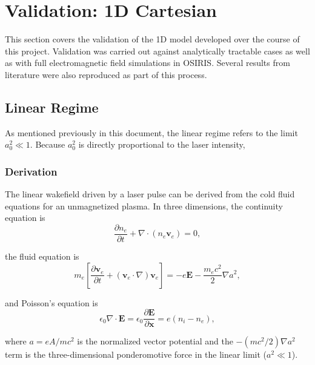 \newpage
\section{Validation: 1D Cartesian}

This section covers the validation of the 1D model developed over the course of
this project. Validation was carried out against analytically tractable cases as
well as with full electromagnetic field simulations in OSIRIS. Several results
from literature were also reproduced as part of this process.

\subsection{Linear Regime}

    As mentioned previously in this document, the linear regime refers to the 
    limit $a_0^2 \ll 1$. Because $a_0^2$ is directly proportional to
    the laser intensity, 

    \subsubsection{Derivation}

    The linear wakefield driven by a laser pulse can be derived from the cold
    fluid equations for an unmagnetized plasma. In three dimensions, the 
    continuity equation is
    \begin{equation*}
        \frac{\partial n_e}{\partial t} + \nabla \cdot (n_e\mathbf{v}_e) = 0,
    \end{equation*}

    the fluid equation is
    \begin{equation*}
        m_e\left[\frac{\partial \mathbf{v}_e}{\partial t} + (\mathbf{v}_e \cdot
        \nabla)\mathbf{v}_e\right] = -e\mathbf{E} - \frac{m_ec^2}{2}\nabla a^2,
    \end{equation*}

    and Poisson's equation is
    \begin{equation*}
        \epsilon_0 \nabla \cdot \mathbf{E} = \epsilon_0\frac{\partial 
        \mathbf{E}}{\partial \mathbf{x}} = e(n_i - n_e),
    \end{equation*}


    where $a = eA/mc^2$ is the normalized vector potential and the 
    $-(mc^2/2)\nabla a^2$ term is the three-dimensional ponderomotive force in 
    the linear limit ($a^2 \ll 1$).
    \vspace{1em}

